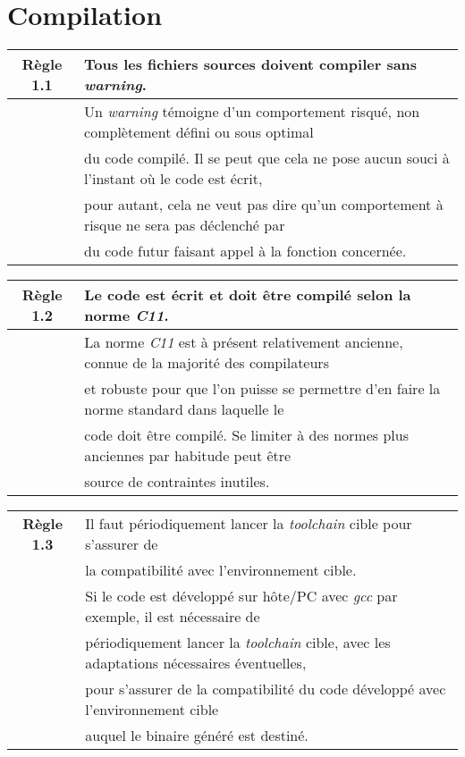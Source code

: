 \section{Compilation}

\begin{center}
\begin{tabular}{|c l|}
\hline
\rowcolor{red!10}\textbf{Règle 1.1} & Tous les fichiers sources doivent compiler sans \textit{warning}. \\ \hline
 & Un \textit{warning} témoigne d'un comportement risqué, non complètement défini ou sous optimal \\
 & du code compilé. Il se peut que cela ne pose aucun souci à l'instant où le code est écrit, \\
 & pour autant, cela ne veut pas dire qu'un comportement à risque ne sera pas déclenché par \\
 & du code futur faisant appel à la fonction concernée.\\ \hline
\hline
\end{tabular}
\end{center}

\medskip

\begin{center}
\begin{tabular}{|c l|}
\hline
\rowcolor{red!10}\textbf{Règle 1.2} & Le code est écrit et doit être compilé selon la norme \textit{C11}. \\ \hline
 & La norme \textit{C11} est à présent relativement ancienne, connue de la majorité des compilateurs \\
 & et robuste pour que l'on puisse se permettre d'en faire la norme standard dans laquelle le \\
 & code doit être compilé. Se limiter à des normes plus anciennes par habitude peut être \\
 & source de contraintes inutiles.\\ \hline
\hline
\end{tabular}
\end{center}

\medskip

\begin{center}
\begin{tabular}{|c l|}
\hline
\rowcolor{red!10}\textbf{Règle 1.3} & Il faut périodiquement lancer la \textit{toolchain} cible pour s'assurer de \\
\rowcolor{red!10} & la compatibilité avec l'environnement cible. \\ \hline
 &  Si le code est développé sur hôte/PC avec \textit{gcc} par exemple, il est nécessaire de \\
 & périodiquement lancer la \textit{toolchain} cible, avec les adaptations nécessaires éventuelles, \\
 & pour s'assurer de la compatibilité du code développé avec l'environnement cible \\
 & auquel le binaire généré est destiné. \\ \hline
\hline
\end{tabular}
\end{center}

